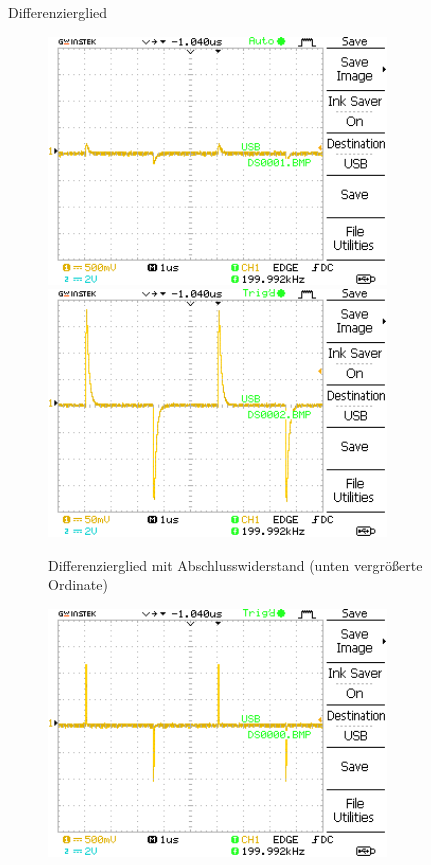 \documentclass[ngerman]{scrartcl}
\theoremstyle{definition}
\begin{document}
\begin{aufgabe}{Differenzierglied}
			\begin{figure}[H]
				\centering
				\includegraphics[width=0.8\textwidth]{MesswerteVersuch1/DS0001.png}
				\includegraphics[width=0.8\textwidth]{MesswerteVersuch1/DS0002.png}
				\caption{Differenzierglied mit Abschlusswiderstand (unten vergrößerte Ordinate)}
				\label{fig:DS0001,2}
			\end{figure}
			\begin{figure}[H]
				\centering
				\includegraphics[width=0.8\textwidth]{MesswerteVersuch1/DS0000.png}

\end{figure}
\end{aufgabe}
\end{document}
